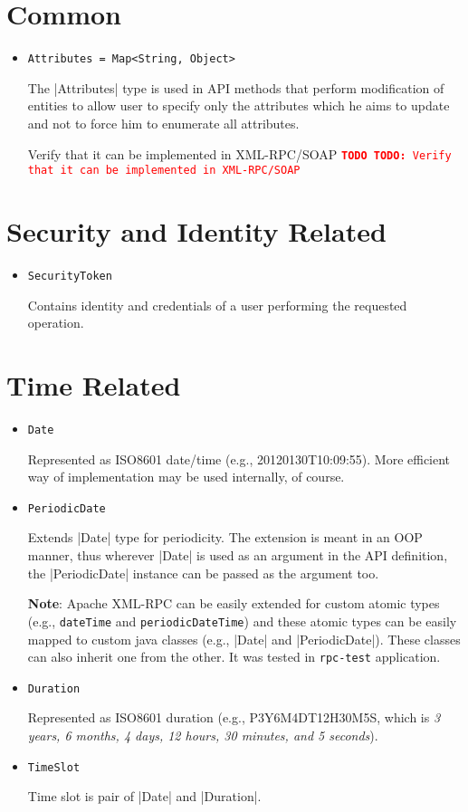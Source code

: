 \documentclass[a4paper]{report}
\newcommand{\APIcmd}[1]{%
\item \lstinline[style=myinline]!#1!%

}
\newenvironment{APIdef}{\begin{itemize}}{\end{itemize}}
\newcommand{\TODO}[1]{%
\def\empty{}%
\def\prvniparametr{#1}%
\ifx\prvniparametr\empty%
\begingroup\tt\textcolor{red}{\noindent\textbf{TODO}}\endgroup
\else%
\begingroup\tt\textcolor{red}{\noindent\textbf{TODO:}\ #1}\endgroup
\fi%
}
\begin{document}
\section{Common}

\begin{APIdef}

\APIcmd{Attributes = Map<String, Object>}
The |Attributes| type is used in API methods that perform modification of entities to allow user to specify only the attributes which he aims to update and not to force him
to enumerate all attributes.

\TODO{Verify that it can be implemented in XML-RPC/SOAP}

\end{APIdef}


\section{Security and Identity Related}

\begin{APIdef}

\APIcmd{SecurityToken}
Contains identity and credentials of a user performing the requested operation.

\end{APIdef}


\section{Time Related}

\begin{APIdef}

\APIcmd{Date}
Represented as ISO8601 date/time (e.g., 20120130T10:09:55). More efficient way of implementation may be used internally, of course.

\APIcmd{PeriodicDate}
Extends |Date| type for periodicity. The extension is meant in an OOP manner, thus wherever |Date| is used as an argument in the API definition, the |PeriodicDate| instance can be passed as the argument too.

\textbf{Note}: Apache XML-RPC can be easily extended for custom atomic types (e.g., \verb|dateTime| and \verb|periodicDateTime|) and these atomic types can be easily mapped to custom java classes (e.g., |Date| and |PeriodicDate|). These classes can also inherit one from the other. It was tested in \verb|rpc-test| application.

\APIcmd{Duration}
Represented as ISO8601 duration (e.g., P3Y6M4DT12H30M5S, which is \textit{3 years, 6 months, 4 days, 12 hours, 30 minutes, and 5 seconds}).

\APIcmd{TimeSlot}
Time slot is pair of |Date| and |Duration|.

\end{APIdef}
\end{document}
